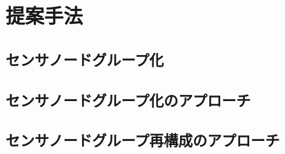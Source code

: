 \chapter{提案手法}
\section{センサノードグループ化}


\section{センサノードグループ化のアプローチ}




\section{センサノードグループ再構成のアプローチ}

